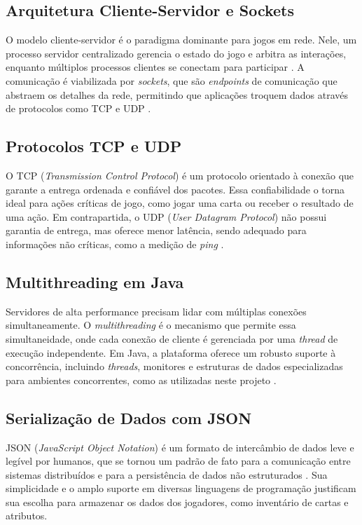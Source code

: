 \documentclass[corpo=12pt,a4paper]{sbc-artigos}
\begin{document}
\subsection{Arquitetura Cliente-Servidor e Sockets}
O modelo cliente-servidor é o paradigma dominante para jogos em rede. Nele, um processo servidor centralizado gerencia o estado do jogo e arbitra as interações, enquanto múltiplos processos clientes se conectam para participar \cite{tanenbaum2011redes}. A comunicação é viabilizada por \textit{sockets}, que são \textit{endpoints} de comunicação que abstraem os detalhes da rede, permitindo que aplicações troquem dados através de protocolos como TCP e UDP \cite{kurose2017redes}.

\subsection{Protocolos TCP e UDP}
O TCP (\textit{Transmission Control Protocol}) é um protocolo orientado à conexão que garante a entrega ordenada e confiável dos pacotes. Essa confiabilidade o torna ideal para ações críticas de jogo, como jogar uma carta ou receber o resultado de uma ação. Em contrapartida, o UDP (\textit{User Datagram Protocol}) não possui garantia de entrega, mas oferece menor latência, sendo adequado para informações não críticas, como a medição de \textit{ping} \cite{kurose2017redes}.

\subsection{Multithreading em Java}
Servidores de alta performance precisam lidar com múltiplas conexões simultaneamente. O \textit{multithreading} é o mecanismo que permite essa simultaneidade, onde cada conexão de cliente é gerenciada por uma \textit{thread} de execução independente. Em Java, a plataforma oferece um robusto suporte à concorrência, incluindo \textit{threads}, monitores e estruturas de dados especializadas para ambientes concorrentes, como as utilizadas neste projeto \cite{goetz2006java}.

\subsection{Serialização de Dados com JSON}
JSON (\textit{JavaScript Object Notation}) é um formato de intercâmbio de dados leve e legível por humanos, que se tornou um padrão de fato para a comunicação entre sistemas distribuídos e para a persistência de dados não estruturados \cite{rfc8259}. Sua simplicidade e o amplo suporte em diversas linguagens de programação justificam sua escolha para armazenar os dados dos jogadores, como inventário de cartas e atributos.
\end{document}
